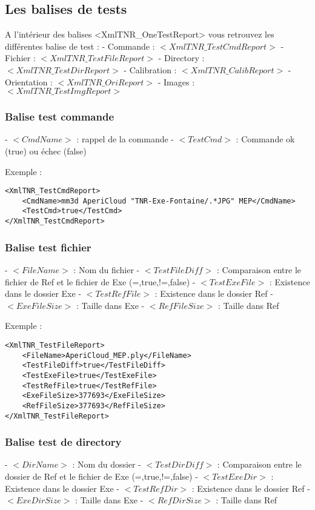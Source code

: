 \documentclass[a4paper]{book}
\begin{document}
\subsection{Les balises de tests}
A l’int\'erieur des balises <XmlTNR\_OneTestReport> vous retrouvez les diff\'erentes balise de test :
- Commande : $<XmlTNR\_TestCmdReport>$
- Fichier : $<XmlTNR\_TestFileReport>$
- Directory : $<XmlTNR\_TestDirReport>$
- Calibration : $<XmlTNR\_CalibReport>$
- Orientation : $<XmlTNR\_OriReport>$
- Images : $<XmlTNR\_TestImgReport>$

\subsubsection{Balise test commande}
	- $<CmdName>$ : rappel de la commande
	- $<TestCmd>$ : Commande ok (true) ou \'echec (false)

Exemple : 
\begin{verbatim}
<XmlTNR_TestCmdReport>
	<CmdName>mm3d AperiCloud "TNR-Exe-Fontaine/.*JPG" MEP</CmdName>
	<TestCmd>true</TestCmd>
</XmlTNR_TestCmdReport>
\end{verbatim}

\subsubsection{Balise test fichier}
	- $<FileName>$ : Nom du fichier
	- $<TestFileDiff>$ : Comparaison entre le fichier de Ref et le fichier de Exe (=,true,!=,false)
	- $<TestExeFile>$ : Existence dans le dossier Exe
	- $<TestRefFile>$ : Existence dans le dossier Ref
	- $<ExeFileSize>$ : Taille dans Exe
	- $<RefFileSize>$ : Taille dans Ref

Exemple : 
\begin{verbatim}
<XmlTNR_TestFileReport>
	<FileName>AperiCloud_MEP.ply</FileName>
	<TestFileDiff>true</TestFileDiff>
	<TestExeFile>true</TestExeFile>
	<TestRefFile>true</TestRefFile>
	<ExeFileSize>377693</ExeFileSize>
	<RefFileSize>377693</RefFileSize>
</XmlTNR_TestFileReport>
\end{verbatim}

\subsubsection{Balise test de directory}
	- $<DirName>$ : Nom du dossier
	- $<TestDirDiff>$ : Comparaison entre le dossier de Ref et le fichier de Exe (=,true,!=,false)
	- $<TestExeDir>$ : Existence dans le dossier Exe
	- $<TestRefDir>$ : Existence dans le dossier Ref
	- $<ExeDirSize>$ : Taille dans Exe
	- $<RefDirSize>$ : Taille dans Ref
\end{document}
